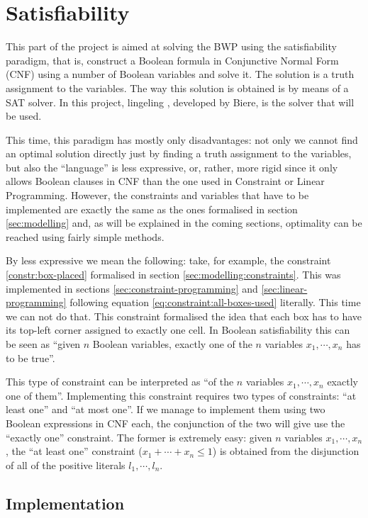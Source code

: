 \section{Satisfiability}
\label{sec:satisfiability}

This part of the project is aimed at solving the BWP using the
satisfiability paradigm, that is, construct a Boolean formula
in Conjunctive Normal Form (CNF) using a number of Boolean
variables and solve it. The solution is a truth assignment to
the variables. The way this solution is obtained is by means
of a SAT solver. In this project, lingeling \cite{lingeling},
developed by Biere, is the solver that will be used.

\hfill

This time, this paradigm has mostly only disadvantages: not only
we cannot find an optimal solution directly just by finding
a truth assignment to the variables, but also the ``language''
is less expressive, or, rather, more rigid since it only allows
Boolean clauses in CNF than the one used in Constraint or Linear
Programming. However, the constraints and variables that have
to be implemented are exactly the same as the ones formalised
in section \ref{sec:modelling} and, as will be explained in the
coming sections, optimality can be reached using fairly simple
methods.

\hfill

By less expressive we mean the following: take, for example,
the constraint \ref{constr:box-placed} formalised in section
\ref{sec:modelling:constraints}. This was implemented in
sections \ref{sec:constraint-programming} and \ref{sec:linear-programming}
following equation \ref{eq:constraint:all-boxes-used} literally.
This time we can not do that. This constraint formalised the idea
that each box has to have its top-left corner assigned to exactly
one cell. In Boolean satisfiability this can be seen as ``given $n$
Boolean variables, exactly one of the $n$ variables $x_1,\cdots,x_n$ has
to be true''.



This type of constraint
can be interpreted as ``of the $n$ variables $x_1,\cdots,x_n$ exactly
one of them''. Implementing this
constraint requires two types of constraints: ``at least one''
and ``at most one''. If we manage to implement them using two
Boolean expressions in CNF each, the conjunction of the two
will give use the ``exactly one'' constraint. The former is
extremely easy: given $n$ variables $x_1,\cdots,x_n$, the
``at least one'' constraint ($x_1+\cdots+x_n\le 1$) is obtained
from the disjunction of all of the positive literals $l_1,\cdots,l_n$.

\subsection{Implementation}

